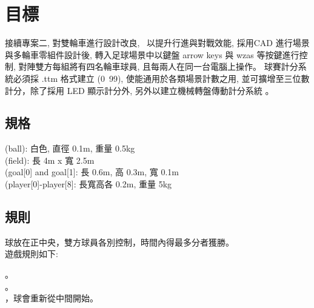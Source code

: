 \chapter{目標}
接續專案二, 對雙輪車進行設計改良,  以提升行進與對戰效能, 採用CAD 進行場景與多輪車零組件設計後, 轉入足球場景中以鍵盤 arrow keys 與 wzas 等按鍵進行控制, 對陣雙方每組將有四名輪車球員, 且每兩人在同一台電腦上操作。
球賽計分系統必須採 .ttm 格式建立 (0~99), 使能通用於各類場景計數之用, 並可擴增至三位數計分，除了採用 LED 顯示計分外, 另外以建立機械轉盤傳動計分系統 。

\section{規格}
\begin{enumerate}
 (ball): 白色, 直徑 0.1m, 重量 0.5kg \\
 (field): 長 4m x 寬 2.5m \\
 (goal[0] and goal[1]: 長 0.6m, 高 0.3m, 寬 0.1m \\
 (player[0]-player[8]: 長寬高各 0.2m, 重量 5kg \\
\end{enumerate}

\section{規則}
球放在正中央，雙方球員各別控制，時間內得最多分者獲勝。 \\
遊戲規則如下: \\
\begin{enumerate}
。 \\
。 \\
，球會重新從中間開始。 \\
\end{enumerate}
